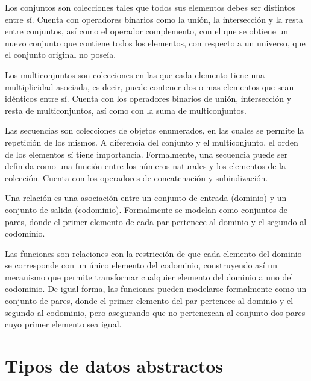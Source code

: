 \begin{description}[leftmargin=!,labelwidth=\widthof{\bfseries Multiconjunto}]

  \item [Conjunto] Los conjuntos son colecciones tales que todos sus elementos
  debes ser distintos entre sí. Cuenta con operadores binarios como la unión, la
  intersección y la resta entre conjuntos, así como el operador complemento, con
  el que se obtiene un nuevo conjunto que contiene todos los elementos, con
  respecto a un universo, que el conjunto original no poseía.

  \item [Multiconjunto] Los multiconjuntos son colecciones en las que cada
  elemento tiene una multiplicidad asociada, es decir, puede contener dos o mas
  elementos que sean idénticos entre sí. Cuenta con los operadores  binarios de
  unión, intersección y resta de multiconjuntos, así como con la suma de
  multiconjuntos.

  \item [Secuencia] Las secuencias son colecciones de objetos enumerados, en las
  cuales se permite la repetición de los mismos. A diferencia del conjunto y el
  multiconjunto, el orden de los elementos sí tiene importancia. Formalmente,
  una secuencia puede ser definida como una función entre los números naturales
  y los elementos de la colección. Cuenta con los operadores de concatenación y
  subindización.

  \item [Relación] Una relación es una asociación entre un conjunto de entrada
  (dominio) y un conjunto de salida (codominio). Formalmente se modelan como
  conjuntos de pares, donde el primer elemento de cada par pertenece al dominio
  y el segundo al codominio.

  \item [Función] Las funciones son relaciones con la restricción de que cada
  elemento del dominio se corresponde con un único elemento del codominio,
  construyendo así un mecanismo que permite transformar cualquier elemento del
  dominio a uno del codominio. De igual forma, las funciones pueden modelarse
  formalmente como un conjunto de pares, donde el primer elemento del par
  pertenece al dominio y el segundo al codominio, pero asegurando que no
  pertenezcan al conjunto dos pares cuyo primer elemento sea igual.

\end{description}

\section{Tipos de datos abstractos}

